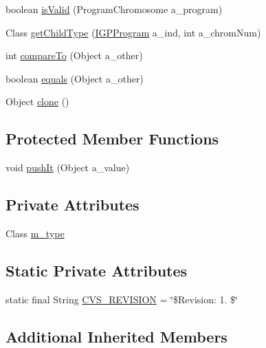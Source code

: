 \begin{DoxyCompactItemize}
\item 
boolean \hyperlink{classorg_1_1jgap_1_1gp_1_1function_1_1_push_a6fc7b172011e49476bbf72e88f0512a6}{is\-Valid} (Program\-Chromosome a\-\_\-program)
\item 
Class \hyperlink{classorg_1_1jgap_1_1gp_1_1function_1_1_push_a88578cc915a9389b0eb86f175de2ea26}{get\-Child\-Type} (\hyperlink{interfaceorg_1_1jgap_1_1gp_1_1_i_g_p_program}{I\-G\-P\-Program} a\-\_\-ind, int a\-\_\-chrom\-Num)
\item 
int \hyperlink{classorg_1_1jgap_1_1gp_1_1function_1_1_push_aa811c900949d907c274a4b8a0641dcca}{compare\-To} (Object a\-\_\-other)
\item 
boolean \hyperlink{classorg_1_1jgap_1_1gp_1_1function_1_1_push_ab7ca908d4bbd4d4cb5c282903488cece}{equals} (Object a\-\_\-other)
\item 
Object \hyperlink{classorg_1_1jgap_1_1gp_1_1function_1_1_push_a1db5f6e434b20ccc05e84146332eaaca}{clone} ()
\end{DoxyCompactItemize}
\subsection*{Protected Member Functions}
\begin{DoxyCompactItemize}
\item 
void \hyperlink{classorg_1_1jgap_1_1gp_1_1function_1_1_push_a9a659cd92190e9e6ed6a988ff1b60cdd}{push\-It} (Object a\-\_\-value)
\end{DoxyCompactItemize}
\subsection*{Private Attributes}
\begin{DoxyCompactItemize}
\item 
Class \hyperlink{classorg_1_1jgap_1_1gp_1_1function_1_1_push_af287dc33b99fa32225734a9b820e6227}{m\-\_\-type}
\end{DoxyCompactItemize}
\subsection*{Static Private Attributes}
\begin{DoxyCompactItemize}
\item 
static final String \hyperlink{classorg_1_1jgap_1_1gp_1_1function_1_1_push_a49c4d90a18c8b5a550944c21cc404729}{C\-V\-S\-\_\-\-R\-E\-V\-I\-S\-I\-O\-N} = \char`\"{}\$Revision\-: 1. \$\char`\"{}
\end{DoxyCompactItemize}
\subsection*{Additional Inherited Members}


